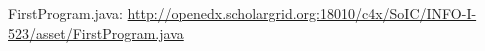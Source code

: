 FirstProgram.java: 
\url{http://openedx.scholargrid.org:18010/c4x/SoIC/INFO-I-523/asset/FirstProgram.java}
